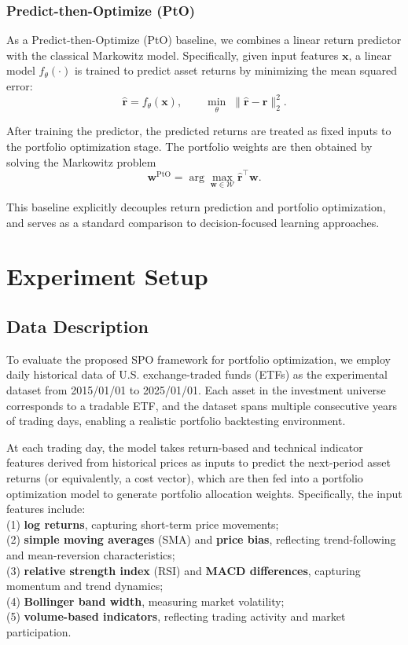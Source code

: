 \documentclass[review]{elsarticle}
\begin{document}
\subsubsection{Predict-then-Optimize (PtO)}

As a Predict-then-Optimize (PtO) baseline, we combines a linear return predictor with the classical Markowitz model.
Specifically, given input features $\bm x$, a linear model $f_\theta(\cdot)$ is trained
to predict asset returns by minimizing the mean squared error:
\begin{equation}
\hat{\bm r} = f_\theta(\bm x),
\qquad
\min_{\theta}\;
\|\hat{\bm r}-\bm r\|_2^2 .
\end{equation}

After training the predictor, the predicted returns are treated as fixed inputs
to the portfolio optimization stage.
The portfolio weights are then obtained by solving the Markowitz problem
\begin{equation}
\bm w^{\mathrm{PtO}}
=
\arg\max_{\bm w\in\mathcal W}
\hat{\bm r}^\top \bm w .
\end{equation}

This baseline explicitly decouples return prediction and portfolio optimization,
and serves as a standard comparison to decision-focused learning approaches.

\section{Experiment Setup}
\subsection{Data Description}
To evaluate the proposed SPO framework for portfolio optimization, we employ daily historical data of U.S. exchange-traded funds (ETFs) as the experimental dataset from 2015/01/01 to 2025/01/01. Each asset in the investment universe corresponds to a tradable ETF, and the dataset spans multiple consecutive years of trading days, enabling a realistic portfolio backtesting environment.

At each trading day, the model takes return-based and technical indicator features derived from historical prices as inputs to predict the next-period asset returns (or equivalently, a cost vector), which are then fed into a portfolio optimization model to generate portfolio allocation weights. Specifically, the input features include:\\
(1) \textbf{log returns}, capturing short-term price movements;\\
(2) \textbf{simple moving averages} (SMA) and \textbf{price bias}, reflecting trend-following and mean-reversion characteristics;\\
(3) \textbf{relative strength index} (RSI) and \textbf{MACD differences}, capturing momentum and trend dynamics;\\
(4) \textbf{Bollinger band width}, measuring market volatility; \\
(5) \textbf{volume-based indicators}, reflecting trading activity and market participation.
\end{document}
